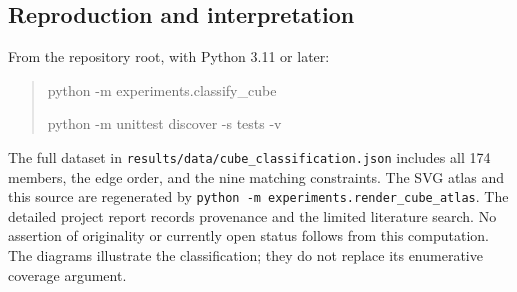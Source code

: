 \documentclass[11pt,letterpaper]{article}
\begin{document}
\subsection*{Reproduction and interpretation}
From the repository root, with Python 3.11 or later:
\begin{quote}\small\ttfamily
python -m experiments.classify\_cube\par
python -m unittest discover -s tests -v
\end{quote}
The full dataset in \texttt{results/data/cube\_classification.json} includes
all 174 members, the edge order, and the nine matching constraints. The SVG
atlas and this source are regenerated by
\texttt{python -m experiments.render\_cube\_atlas}.
The detailed project report records provenance and the limited literature
search. No assertion of originality or currently open status follows from
this computation. The diagrams illustrate the classification; they do not
replace its enumerative coverage argument.
\end{document}

